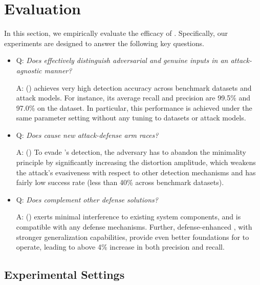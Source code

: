 \section{Evaluation}
\label{sec:evaluation}

In this section, we empirically evaluate the efficacy of \system. Specifically, our experiments are designed to answer the following key questions.
\begin{itemize}
\item Q: {\em Does \system effectively distinguish adversarial and genuine inputs in an attack-agnostic manner?}

A: () \system achieves very high detection accuracy across benchmark datasets and attack models. For instance, its average recall and precision are 99.5\% and 97.0\% on the \mnist dataset. %
In particular, this performance is achieved under the same parameter setting without any tuning to datasets or attack models.

\item Q: {\em Does \system cause new attack-defense arm races?}

A: () To evade \system's detection, the adversary has to abandon the minimality principle by significantly increasing the distortion amplitude, which weakens the attack's evasiveness with respect to other detection mechanisms and has fairly low success rate (less than 40\% across benchmark datasets).

\item Q: {\em Does \system complement other defense solutions?}

A: () \system exerts minimal interference to existing system components, and is compatible with any defense mechanisms. Further, defense-enhanced \dnns, with stronger generalization capabilities, provide even better foundations for \system to operate, leading to above 4\% increase in both precision and recall.

\end{itemize}


\subsection{Experimental Settings}

